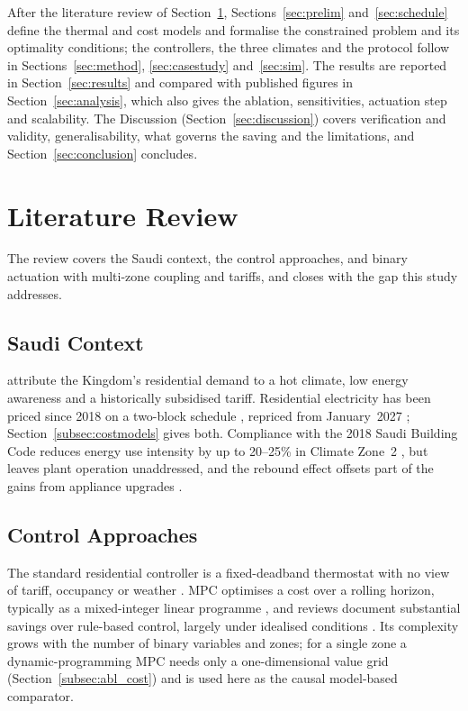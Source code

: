 \documentclass[pdflatex,sn-mathphys-num,iicol]{sn-jnl}
\theoremstyle{thmstyleone}\newtheorem{proposition}{Proposition}\newtheorem{corollary}{Corollary}
\theoremstyle{thmstyletwo}\newtheorem{remark}{Remark}\newtheorem{observation}{Observation}
\theoremstyle{thmstylethree}\newtheorem{definition}{Definition}
\begin{document}
After the literature review of Section~\ref{sec:litreview}, Sections~\ref{sec:prelim} and~\ref{sec:schedule} define the thermal and cost models and formalise the constrained problem and its optimality conditions; the controllers, the three climates and the protocol follow in Sections~\ref{sec:method}, \ref{sec:casestudy} and~\ref{sec:sim}. The results are reported in Section~\ref{sec:results} and compared with published figures in Section~\ref{sec:analysis}, which also gives the ablation, sensitivities, actuation step and scalability. The Discussion (Section~\ref{sec:discussion}) covers verification and validity, generalisability, what governs the saving and the limitations, and Section~\ref{sec:conclusion} concludes.
 
\section{Literature Review}
\label{sec:litreview}

The review covers the Saudi context, the control approaches, and binary actuation with multi-zone coupling and tariffs, and closes with the gap this study addresses.

\subsection{Saudi Context}

\citet{AlHomoud2021} attribute the Kingdom's residential demand to a hot climate, low energy awareness and a historically subsidised tariff. Residential electricity has been priced since 2018 on a two-block schedule \citep{SEC2024}, repriced from January~2027 \citep{SaudiEnergy2027}; Section~\ref{subsec:costmodels} gives both. Compliance with the 2018 Saudi Building Code \citep{Alayed2021} reduces energy use intensity by up to 20--25\% in Climate Zone~2 \citep{Olawale2025}, but leaves plant operation unaddressed, and the rebound effect offsets part of the gains from appliance upgrades \citep{Belaid2024}.

\subsection{Control Approaches}

The standard residential controller is a fixed-deadband thermostat with no view of tariff, occupancy or weather \citep{Alotaibi2024}. MPC optimises a cost over a rolling horizon, typically as a mixed-integer linear programme \citep{Risbeck2017,Dinh2022}, and reviews document substantial savings over rule-based control, largely under idealised conditions \citep{Drgona2020}. Its complexity grows with the number of binary variables and zones; for a single zone a dynamic-programming MPC needs only a one-dimensional value grid (Section~\ref{subsec:abl_cost}) and is used here as the causal model-based comparator.
\end{document}
